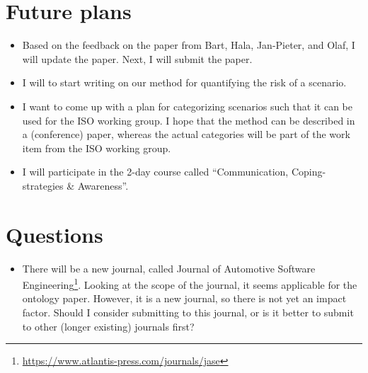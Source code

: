 \documentclass[10pt,final,a4paper,oneside,onecolumn]{article}
\begin{document}
\section{Future plans}

\begin{itemize}
	\item Based on the feedback on the paper from Bart, Hala, Jan-Pieter, and Olaf, I will update the paper. Next, I will submit the paper.
	\item I will to start writing on our method for quantifying the risk of a scenario.
	\item I want to come up with a plan for categorizing scenarios such that it can be used for the ISO working group. I hope that the method can be described in a (conference) paper, whereas the actual categories will be part of the work item from the ISO working group.
	\item I will participate in the 2-day course called ``Communication, Coping-strategies \& Awareness''. 
\end{itemize}

\section{Questions}

\begin{itemize}
	\item There will be a new journal, called Journal of Automotive Software Engineering\footnote{\url{https://www.atlantis-press.com/journals/jase}}. Looking at the scope of the journal, it seems applicable for the ontology paper. However, it is a new journal, so there is not yet an impact factor. Should I consider submitting to this journal, or is it better to submit to other (longer existing) journals first?
\end{itemize}


\printbibliography

\newpage

\end{document}
